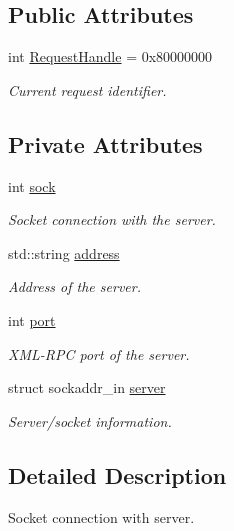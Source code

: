 \subsection*{Public Attributes}
\begin{DoxyCompactItemize}
\item 
int \hyperlink{classTcpClient_ab2a93fc91ae8adf7c94e19651339f996}{Request\-Handle} = 0x80000000
\begin{DoxyCompactList}\small\item\em Current request identifier. \end{DoxyCompactList}\end{DoxyCompactItemize}
\subsection*{Private Attributes}
\begin{DoxyCompactItemize}
\item 
int \hyperlink{classTcpClient_af93f7c8c4d91d93379ba99fd3742c3dc}{sock}
\begin{DoxyCompactList}\small\item\em Socket connection with the server. \end{DoxyCompactList}\item 
std\-::string \hyperlink{classTcpClient_a8bcb24ebf1d8e22e9185f3056fd108c4}{address}
\begin{DoxyCompactList}\small\item\em Address of the server. \end{DoxyCompactList}\item 
int \hyperlink{classTcpClient_aa112ef0470437e790931b3ec9c98a800}{port}
\begin{DoxyCompactList}\small\item\em X\-M\-L-\/\-R\-P\-C port of the server. \end{DoxyCompactList}\item 
struct sockaddr\-\_\-in \hyperlink{classTcpClient_a75a8bd28eca3f1eea17fb430ab14cade}{server}
\begin{DoxyCompactList}\small\item\em Server/socket information. \end{DoxyCompactList}\end{DoxyCompactItemize}


\subsection{Detailed Description}
Socket connection with server. 

